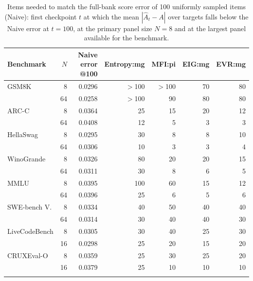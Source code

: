\begin{table}[tbp]
\centering\footnotesize
\caption{Items needed to match the full-bank score error of 100 uniformly sampled items (Naive): first checkpoint $t$ at which the mean $|\hat A_t-A|$ over targets falls below the Naive error at $t=100$, at the primary panel size $N=8$ and at the largest panel available for the benchmark.}
\label{tab:efficiency}
\begin{tabular}{@{}lrrrrrr@{}}
\toprule
Benchmark & $N$ & Naive error @100 & Entropy:mg & MFI:pi & EIG:mg & EVR:mg \\
\midrule
GSM8K & 8 & 0.0296 & $>$100 & $>$100 & 70 & 80 \\
 & 64 & 0.0258 & $>$100 & 90 & 80 & 80 \\
\addlinespace[2pt]
ARC-C & 8 & 0.0364 & 25 & 15 & 20 & 12 \\
 & 64 & 0.0408 & 12 & 5 & 3 & 3 \\
\addlinespace[2pt]
HellaSwag & 8 & 0.0295 & 30 & 8 & 8 & 10 \\
 & 64 & 0.0306 & 10 & 3 & 3 & 4 \\
\addlinespace[2pt]
WinoGrande & 8 & 0.0326 & 80 & 20 & 20 & 15 \\
 & 64 & 0.0311 & 30 & 8 & 6 & 5 \\
\addlinespace[2pt]
MMLU & 8 & 0.0395 & 100 & 60 & 15 & 12 \\
 & 64 & 0.0396 & 25 & 6 & 5 & 6 \\
\addlinespace[2pt]
SWE-bench V. & 8 & 0.0334 & 40 & 50 & 40 & 40 \\
 & 64 & 0.0314 & 30 & 40 & 40 & 30 \\
\addlinespace[2pt]
LiveCodeBench & 8 & 0.0305 & 30 & 40 & 25 & 30 \\
 & 16 & 0.0298 & 25 & 20 & 15 & 20 \\
\addlinespace[2pt]
CRUXEval-O & 8 & 0.0359 & 25 & 30 & 25 & 20 \\
 & 16 & 0.0379 & 25 & 10 & 10 & 10 \\
\addlinespace[2pt]
\bottomrule
\end{tabular}
\end{table}
